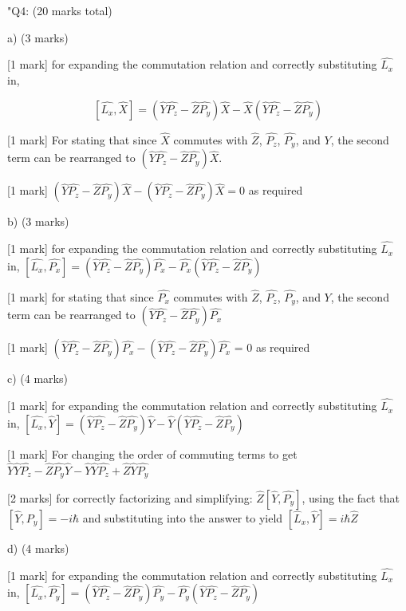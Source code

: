 "{Q4: (20 marks total) }

a) (3 marks)

[1 mark] for expanding the commutation relation and correctly substituting \( \hat{L_{x}} \) in, 

\[ 
\left[ \hat{L_{x}}, \hat{X} \right] = (\hat{Y}\hat{P_{z}} - \hat{Z}\hat{P_{y}})\hat{X} - \hat{X}(\hat{Y}\hat{P_{z}} - \hat{Z}\hat{P_{y}})
\]

[1 mark] For stating that since \( \hat{X} \) commutes with \( \hat{Z} \), \( \hat{P_{z}} \), \( \hat{P_{y}} \), and \( Y \), the second term can be rearranged to \( (\hat{Y}\hat{P_{z}} - \hat{Z}\hat{P_{y}})\hat{X} \).

[1 mark] \( (\hat{Y}\hat{P_{z}} - \hat{Z}\hat{P_{y}})\hat{X} - (\hat{Y}\hat{P_{z}} - \hat{Z}\hat{P_{y}})\hat{X} = 0 \) as required

b) (3 marks)

[1 mark] for expanding the commutation relation and correctly substituting \( \hat{L_{x}} \) in, \([\hat{L_{x}}, \hat{P_{x}}] = (\hat{Y}\hat{P_{z}} - \hat{Z}\hat{P_{y}})\hat{P_{x}} - \hat{P_{x}}(\hat{Y}\hat{P_{z}} - \hat{Z}\hat{P_{y}})\)

[1 mark] for stating that since \( \hat{P_{x}} \) commutes with \( \hat{Z} \), \( \hat{P_{z}} \), \( \hat{P_{y}} \), and \( Y \), the second term can be rearranged to \( (\hat{Y}\hat{P_{z}} - \hat{Z}\hat{P_{y}})\hat{P_{x}} \)

[1 mark] \((\hat{Y}\hat{P_{z}} - \hat{Z}\hat{P_{y}})\hat{P_{x}}  - (\hat{Y}\hat{P_{z}} - \hat{Z}\hat{P_{y}})\hat{P_{x}}\)  = 0 as required

c)  (4 marks)

[1 mark] for expanding the commutation relation and correctly substituting \( \hat{L_{x}} \) in, \([\hat{L_{x}}, \hat{Y}] = (\hat{Y}\hat{P_{z}} - \hat{Z}\hat{P_{y}})\hat{Y} - \hat{Y}(\hat{Y}\hat{P_{z}} - \hat{Z}\hat{P_{y}})\)

[1 mark] For changing the order of commuting terms to get \( \hat{Y}\hat{Y}\hat{P_{z}} - \hat{Z}\hat{P_{y}}\hat{Y} - \hat{Y}\hat{Y}\hat{P_{z}} + \hat{Z}\hat{Y}\hat{P_{y}} \)

[2 marks] for correctly factorizing and simplifying: \( \hat{Z}[\hat{Y}, \hat{P_{y}}] \), using the fact that \( [\hat{Y}, \hat{P_{y}}] = -i\hbar \) and substituting into the answer to yield \( [\hat{L}_x, \hat{Y}] = i\hbar \hat{Z} \)

d) (4 marks)

[1 mark] for expanding the commutation relation and correctly substituting \( \hat{L_{x}} \) in, \([\hat{L_{x}}, \hat{P_{y}}] = (\hat{Y}\hat{P_{z}} - \hat{Z}\hat{P_{y}})\hat{P_{y}} - \hat{P_{y}}(\hat{Y}\hat{P_{z}} - \hat{Z}\hat{P_{y}})\)

